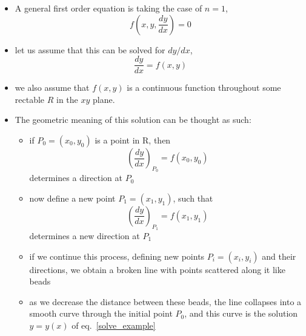 \documentclass[../jaynes_prob_theory_notes.tex]{subfiles}
\begin{document}
\begin{itemize}
                \begin{itemize}
                    \item A general first order equation is taking the case of $n=1$,
                        \begin{equation*}
                            f \left( x,y, \frac{dy}{dx} \right) = 0
                        \end{equation*}
                    \item let us assume that this can be solved for $dy/dx$,
                        \begin{equation*}
                            \label{solve_example}
                            \frac{dy}{dx} = f(x,y)
                        \end{equation*}
                    \item we also assume that $f(x,y)$ is a continuous function throughout some rectable $R$ in the $xy$ plane. 
                    \item The geometric meaning of this solution can be thought as such:
                        \begin{itemize}
                            \item if $P_0 = (x_0, y_0)$ is a point in R, then
                                \begin{equation*}
                                    {\left( \frac{dy}{dx} \right)}_{P_0} = f(x_0,y_0)
                                \end{equation*}
                            determines a direction at $P_0$
                            \item now define a new point $P_1 = (x_1,y_1)$, such that 
                            \begin{equation*}
                                    {\left( \frac{dy}{dx} \right)}_{P_1} = f(x_1,y_1)
                            \end{equation*}
                            determines a new direction at $P_1$
                            \item if we continue this process, defining new points $P_i = (x_i, y_i)$ and their directions, we obtain a broken line with points scattered along it like beads
                            \item as we decrease the distance between these beads, the line collapses into a smooth curve through the initial point $P_0$, and this curve is the solution $y = y(x)$ of eq.~\ref{solve_example}
                        \end{itemize}

\end{itemize}
\end{itemize}
\end{document}
